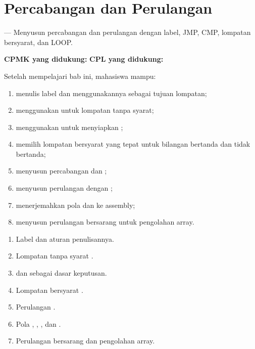 \documentclass[../../main.tex]{subfiles}
\begin{document}
\chapter{Percabangan dan Perulangan}
\label{chap:kontrol}


\begin{subcpmkbox}
\vspace{1.1em}
 --- Menyusun percabangan dan perulangan dengan label,
JMP, CMP, lompatan bersyarat, dan LOOP.

\vspace{0.4em}
\textbf{CPMK yang didukung:}  \quad\textbullet\quad
\textbf{CPL yang didukung:} 
\end{subcpmkbox}

\begin{tujuanbox}
\vspace{1.1em}
Setelah mempelajari bab ini, mahasiswa mampu:
\begin{enumerate}
    \item menulis label dan menggunakannya sebagai tujuan lompatan;
    \item menggunakan  untuk lompatan tanpa syarat;
    \item menggunakan  untuk menyiapkan ;
    \item memilih lompatan bersyarat yang tepat untuk bilangan
          bertanda dan tidak bertanda;
    \item menyusun percabangan  dan ;
    \item menyusun perulangan dengan ;
    \item menerjemahkan pola  dan  ke assembly;
    \item menyusun perulangan bersarang untuk pengolahan array.
\end{enumerate}
\end{tujuanbox}

\begin{materibox}
\vspace{1.1em}
\begin{enumerate}
    \item Label dan aturan penulisannya.
    \item Lompatan tanpa syarat .
    \item {} dan  sebagai dasar keputusan.
    \item Lompatan bersyarat .
    \item Perulangan .
    \item Pola , , , dan
          .
    \item Perulangan bersarang dan pengolahan array.
\end{enumerate}
\end{materibox}










\end{document}
